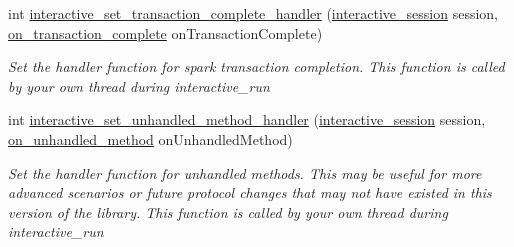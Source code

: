 \begin{DoxyCompactItemize}
int \mbox{\hyperlink{group___interactivity_ga3db94cd0c6b594bdacaa90d1a8f1175d}{interactive\+\_\+set\+\_\+transaction\+\_\+complete\+\_\+handler}} (\mbox{\hyperlink{group___interactivity_ga6d8819d38b8dc8994a2299cf22a65a31}{interactive\+\_\+session}} session, \mbox{\hyperlink{group___interactivity_gadd027ab4911a031b88ecd8603ed7cbd3}{on\+\_\+transaction\+\_\+complete}} on\+Transaction\+Complete)
\begin{DoxyCompactList}\small\item\em Set the handler function for spark transaction completion. This function is called by your own thread during {\ttfamily interactive\+\_\+run} \end{DoxyCompactList}\item 
int \mbox{\hyperlink{group___interactivity_ga64a2774cdc221930f838bde73190ef52}{interactive\+\_\+set\+\_\+unhandled\+\_\+method\+\_\+handler}} (\mbox{\hyperlink{group___interactivity_ga6d8819d38b8dc8994a2299cf22a65a31}{interactive\+\_\+session}} session, \mbox{\hyperlink{group___interactivity_ga1f1661f615bd28112daad64f95103a6a}{on\+\_\+unhandled\+\_\+method}} on\+Unhandled\+Method)
\begin{DoxyCompactList}\small\item\em Set the handler function for unhandled methods. This may be useful for more advanced scenarios or future protocol changes that may not have existed in this version of the library. This function is called by your own thread during {\ttfamily interactive\+\_\+run} \end{DoxyCompactList}\end{DoxyCompactItemize}
